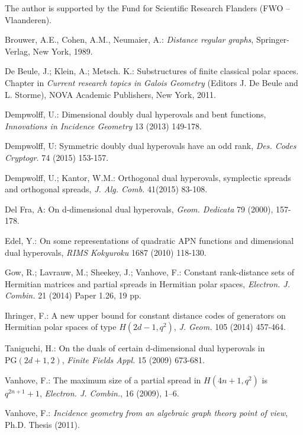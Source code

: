 \documentclass{amsart}
\theoremstyle{plain}
\theoremstyle{definition}
\begin{document}
The author is supported by the Fund for Scientific Research Flanders (FWO -- Vlaanderen).
\begin{thebibliography}{9}

Brouwer, A.E., Cohen, A.M., Neumaier, A.: {\it Distance regular graphs}, 
 Springer-Verlag, New York, 1989.

De Beule, J.; Klein, A.; Metsch. K.: Substructures of finite classical polar spaces. Chapter in {\it Current research topics in Galois Geometry} (Editors J. De Beule and L. Storme), NOVA Academic Publishers, New York, 2011.

Dempwolff, U.: Dimensional doubly dual hyperovals and bent functions, {\it Innovations in Incidence Geometry} 13 (2013) 149-178.
 
Dempwolff, U: Symmetric doubly dual hyperovals have an odd rank, {\it Des. Codes Cryptogr.} 74 (2015) 153-157.

Dempwolff, U.; Kantor, W.M.: Orthogonal dual hyperovals, symplectic spreads and orthogonal spreads, {\it J. Alg. Comb.} 41(2015) 83-108.

Del Fra, A: On d-dimensional dual hyperovals, {\it Geom. Dedicata} 79 (2000), 157-178.

Edel, Y.: On some representations of quadratic APN functions and dimensional dual hyperovals, {\it RIMS Kokyuroku} 1687 (2010) 118-130.

Gow, R.; Lavrauw, M.; Sheekey, J.; Vanhove, F.: Constant rank-distance sets of Hermitian matrices and partial spreads in Hermitian polar spaces, {\it Electron. J. Combin.} 21 (2014) Paper 1.26, 19 pp. 

Ihringer, F.: A new upper bound for constant distance codes of generators on Hermitian polar spaces of type $H(2d-1,q^2)$, {\it J. Geom.} 105 (2014) 457-464.

Taniguchi, H.: On the duals of certain d-dimensional dual hyperovals in ${\mathrm{PG}}(2d+1,2)$, {\it Finite Fields Appl.} 15 (2009) 673-681.

Vanhove, F.: The maximum size of a partial spread in $H(4n + 1, q^2)$ is $q^{2n+1} + 1$, {\it Electron.
J. Combin.}, 16 (2009), 1--6.

Vanhove, F.: {\it Incidence geometry from an algebraic graph theory point of view}, Ph.D. Thesis (2011).


\end{thebibliography}
\end{document}
